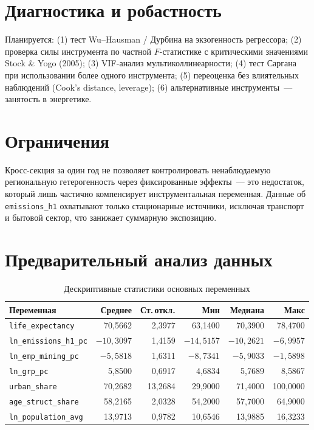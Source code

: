 \documentclass[11pt,a4paper]{article}
\begin{document}
\section*{Диагностика и робастность}

Планируется: (1) тест Wu--Hausman / Дурбина на экзогенность регрессора; (2) проверка силы инструмента по частной $F$-статистике с критическими значениями Stock \& Yogo (2005); (3) VIF-анализ мультиколлинеарности; (4) тест Саргана при использовании более одного инструмента; (5) переоценка без влиятельных наблюдений (Cook's distance, leverage); (6) альтернативные инструменты~--- занятость в энергетике.

\section*{Ограничения}

Кросс-секция за один год не позволяет контролировать ненаблюдаемую региональную гетерогенность через фиксированные эффекты~--- это недостаток, который лишь частично компенсирует инструментальная переменная. Данные об \texttt{emissions\_h1} охватывают только стационарные источники, исключая транспорт и бытовой сектор, что занижает суммарную экспозицию.

\section*{Предварительный анализ данных}

\begin{table}[H]
\centering
\caption{Дескриптивные статистики основных переменных}
\label{tab:desc}
\begin{tabular}{lrrrrr}
\toprule
\textbf{Переменная} & \textbf{Среднее} & \textbf{Ст.\,откл.} & \textbf{Мин} & \textbf{Медиана} & \textbf{Макс} \\
\midrule
\texttt{life\_expectancy}    & 70{,}5662  & 2{,}3977  & 63{,}1400   & 70{,}3900  & 78{,}4700 \\
\texttt{ln\_emissions\_h1\_pc} & $-10{,}3097$ & 1{,}4159 & $-14{,}5157$ & $-10{,}2621$ & $-6{,}9957$ \\
\texttt{ln\_emp\_mining\_pc}  & $-5{,}5818$  & 1{,}6311 & $-8{,}7341$  & $-5{,}9033$  & $-1{,}5898$ \\
\texttt{ln\_grp\_pc}          & 5{,}8500   & 0{,}6917  & 4{,}6834    & 5{,}7689   & 8{,}5867 \\
\texttt{urban\_share}        & 70{,}2682  & 13{,}2684 & 29{,}9000   & 71{,}4000  & 100{,}0000 \\
\texttt{age\_struct\_share}  & 58{,}2165  & 2{,}0328  & 54{,}2000   & 57{,}7000  & 64{,}9000 \\
\texttt{ln\_population\_avg} & 13{,}9713  & 0{,}9782  & 10{,}6546   & 13{,}9885  & 16{,}3233 \\
\bottomrule
\end{tabular}
\end{table}
\end{document}
